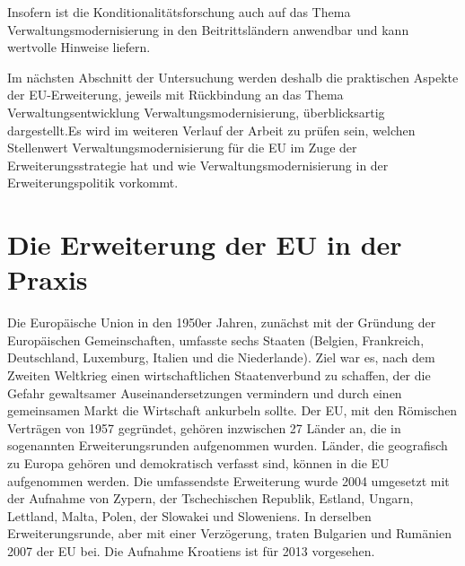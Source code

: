 Insofern ist die Konditionalitätsforschung auch auf das Thema Verwaltungsmodernisierung in den Beitrittsländern anwendbar und kann wertvolle Hinweise liefern. \par
Im nächsten Abschnitt der Untersuchung werden deshalb die praktischen Aspekte der EU-Erweiterung, jeweils mit Rückbindung an das Thema Verwaltungsentwicklung \/ Verwaltungsmodernisierung, überblicksartig dargestellt.Es wird im weiteren Verlauf der Arbeit zu prüfen sein, welchen Stellenwert Verwaltungsmodernisierung für die EU im Zuge der Erweiterungsstrategie hat und wie Verwaltungsmodernisierung in der Erweiterungspolitik vorkommt.
\section{Die Erweiterung der EU in der Praxis }
Die Europäische Union in den 1950er Jahren, zunächst mit der Gründung der Europäischen Gemeinschaften, umfasste sechs Staaten (Belgien, Frankreich, Deutschland, Luxemburg, Italien und die Niederlande). Ziel war es, nach dem Zweiten Weltkrieg einen wirtschaftlichen Staatenverbund zu schaffen, der die Gefahr gewaltsamer Auseinandersetzungen vermindern und durch einen gemeinsamen Markt die Wirtschaft ankurbeln sollte. Der EU, mit den Römischen Verträgen von 1957 gegründet, gehören inzwischen 27 Länder an, die in sogenannten Erweiterungsrunden aufgenommen wurden. Länder, die geografisch zu Europa gehören und demokratisch verfasst sind, können in die EU aufgenommen werden. Die umfassendste Erweiterung wurde 2004 umgesetzt mit der Aufnahme von Zypern, der Tschechischen Republik, Estland, Ungarn, Lettland, Malta, Polen, der Slowakei und Sloweniens. In derselben Erweiterungsrunde, aber mit einer Verzögerung, traten Bulgarien und Rumänien 2007 der EU bei. Die Aufnahme Kroatiens ist für 2013 vorgesehen.\par
